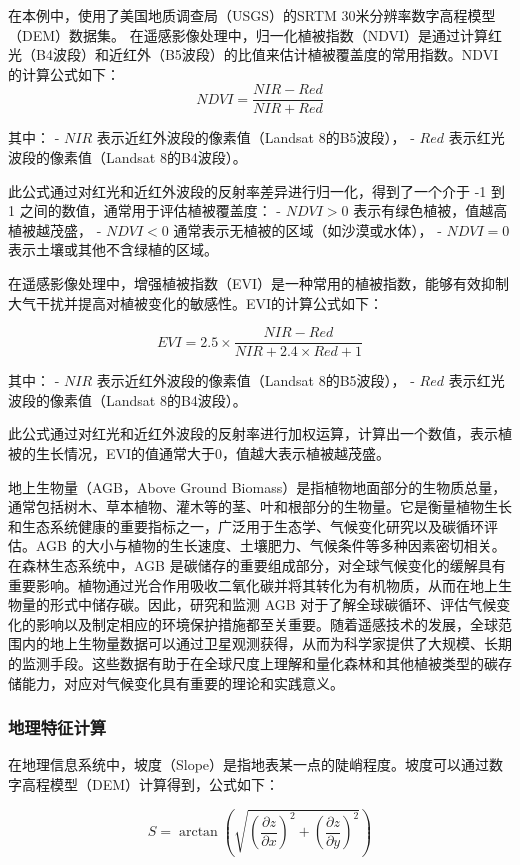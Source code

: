 \documentclass{article}
\begin{document}
				
		在本例中，使用了美国地质调查局（USGS）的SRTM 30米分辨率数字高程模型（DEM）数据集。
		在遥感影像处理中，归一化植被指数（NDVI）是通过计算红光（B4波段）和近红外（B5波段）的比值来估计植被覆盖度的常用指数。NDVI的计算公式如下：
		\[
		NDVI = \frac{NIR - Red}{NIR + Red}
		\]
		
		其中：
		- \( NIR \) 表示近红外波段的像素值（Landsat 8的B5波段），
		- \( Red \) 表示红光波段的像素值（Landsat 8的B4波段）。
		
		此公式通过对红光和近红外波段的反射率差异进行归一化，得到了一个介于 -1 到 1 之间的数值，通常用于评估植被覆盖度：
		- \( NDVI > 0 \) 表示有绿色植被，值越高植被越茂盛，
		- \( NDVI < 0 \) 通常表示无植被的区域（如沙漠或水体），
		- \( NDVI = 0 \) 表示土壤或其他不含绿植的区域。
		
		在遥感影像处理中，增强植被指数（EVI）是一种常用的植被指数，能够有效抑制大气干扰并提高对植被变化的敏感性。EVI的计算公式如下：
		
		\[
		EVI = 2.5 \times \frac{NIR - Red}{NIR + 2.4 \times Red + 1}
		\]
		
		其中：
		- \( NIR \) 表示近红外波段的像素值（Landsat 8的B5波段），
		- \( Red \) 表示红光波段的像素值（Landsat 8的B4波段）。
		
		此公式通过对红光和近红外波段的反射率进行加权运算，计算出一个数值，表示植被的生长情况，EVI的值通常大于0，值越大表示植被越茂盛。
		\par
		地上生物量（AGB，Above Ground Biomass）是指植物地面部分的生物质总量，通常包括树木、草本植物、灌木等的茎、叶和根部分的生物量。它是衡量植物生长和生态系统健康的重要指标之一，广泛用于生态学、气候变化研究以及碳循环评估。AGB 的大小与植物的生长速度、土壤肥力、气候条件等多种因素密切相关。在森林生态系统中，AGB 是碳储存的重要组成部分，对全球气候变化的缓解具有重要影响。植物通过光合作用吸收二氧化碳并将其转化为有机物质，从而在地上生物量的形式中储存碳。因此，研究和监测 AGB 对于了解全球碳循环、评估气候变化的影响以及制定相应的环境保护措施都至关重要。随着遥感技术的发展，全球范围内的地上生物量数据可以通过卫星观测获得，从而为科学家提供了大规模、长期的监测手段。这些数据有助于在全球尺度上理解和量化森林和其他植被类型的碳存储能力，对应对气候变化具有重要的理论和实践意义。
		\subsubsection{地理特征计算}
		
		在地理信息系统中，坡度（Slope）是指地表某一点的陡峭程度。坡度可以通过数字高程模型（DEM）计算得到，公式如下：
		
		\[
		S = \arctan \left( \sqrt{ \left( \frac{\partial z}{\partial x} \right)^2 + \left( \frac{\partial z}{\partial y} \right)^2 } \right)
		\]
		
\end{document}
